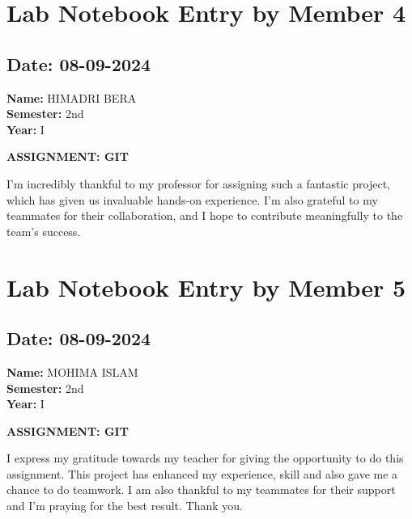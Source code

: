 \documentclass[12pt]{article}
\begin{document}
\newpage

\section{Lab Notebook Entry by Member 4}
\subsection*{Date: 08-09-2024}

\begin{flushright}
\textbf{Name:} HIMADRI BERA \\
\textbf{Semester:} 2nd \\
\textbf{Year:} I \\
\end{flushright}

\begin{center}
\Huge \textbf{ASSIGNMENT: GIT}
\end{center}

I'm incredibly thankful to my professor for assigning such a fantastic project, which has given us invaluable hands-on experience. I'm also grateful to my teammates for their collaboration, and I hope to contribute meaningfully to the team's success.

\newpage

\section{Lab Notebook Entry by Member 5}
\subsection*{Date: 08-09-2024}

\begin{flushright}
\textbf{Name:} MOHIMA ISLAM \\
\textbf{Semester:} 2nd \\
\textbf{Year:} I \\
\end{flushright}

\begin{center}
\Huge \textbf{ASSIGNMENT: GIT}
\end{center}

I express my gratitude towards my teacher for giving the opportunity to do this assignment. This project has enhanced my experience, skill and also gave me a chance to do teamwork. I am also thankful to my teammates for their support and I'm praying for the best result. Thank you.
\end{document}
